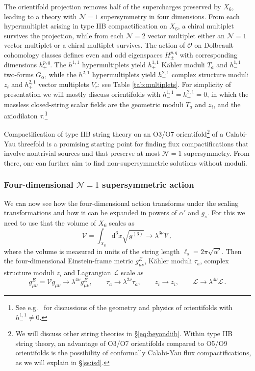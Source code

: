 \documentclass[12pt,a4wide]{article}
\def\d{\mathrm{d}}
\def\V{\mathcal{V}}
\def\L{\mathcal{L}}
\def\be{\begin{equation}}
\def\ee{\end{equation}}
\begin{document}
The orientifold projection removes half of the supercharges preserved by $X_6$, leading to a theory with $\mathcal{N}=1$ supersymmetry in four dimensions.  
From each hypermultiplet arising in type IIB compactification on $X_6$, a chiral multiplet survives the projection, while from each $\mathcal{N}=2$ vector multiplet either an $\mathcal{N}=1$ vector multiplet or a chiral multiplet survives.  
The action of $\mathcal{O}$ on Dolbeault cohomology classes defines even and odd eigenspaces $H^{p,q}_{\pm}$ with corresponding dimensions $h^{p,q}_{\pm}$.  
The $h^{1,1}$ hypermultiplets yield $h^{1,1}_+$ K\"ahler moduli $T_a$ and $h^{1,1}_-$ two-forms $G_\alpha$, while the  
$h^{2,1}$ hypermultiplets yield $h^{2,1}_-$ complex structure moduli $z_i$ and $h^{2,1}_+$ vector multiplets $V_r$: see Table \ref{tab:multiplets}. 
For simplicity of presentation we will mostly discuss orientifolds with $h^{1,1}_-=h^{2,1}_+=0$,
in which
the massless closed-string scalar fields 
are the geometric moduli $T_a$ and $z_i$, and the axiodilaton $\tau$.\footnote{See e.g.~\cite{Grimm:2004uq,Grimm:2007xm,McAllister:2008hb,Gao:2013pra,Hebecker:2018yxs,Carta:2020ohw,Moritz:2023jdb}
for discussions of the geometry and physics of orientifolds with $h^{1,1}_- \neq 0$.}
 
Compactification of type IIB string theory on an O3/O7 orientifold\footnote{We will discuss other string theories in \S\ref{eq:beyondiib}.  Within type IIB string theory, an advantage of O3/O7 orientifolds compared to O5/O9 orientifolds is the possibility of conformally Calabi-Yau flux compactifications, as we will explain in \S\ref{ss:isd}.} of a Calabi-Yau threefold is a promising starting point for finding flux compactifications that involve nontrivial sources and that preserve at most $\mathcal{N}=1$ supersymmetry. From there, one can further aim to find non-supersymmetric solutions without moduli.





\subsubsection*{Four-dimensional $\mathcal{N}=1$ supersymmetric action}
We can now see how the four-dimensional action transforms under the scaling transformations and how it can be expanded in powers of $\alpha'$ and $g_s$. 
For this we need to use that the volume of $X_6$
scales as
\be \label{eq:vscales}
\V=\int_{X_6}\d^6x \sqrt{g^{(6)}}\rightarrow \lambda^{3\nu}\V\,,
\ee
where the volume is measured in units of the string length $\ell_s=2\pi\sqrt{\alpha'}$. Then the four-dimensional Einstein-frame metric $g^E_{\mu\nu}$, K\"ahler moduli $\tau_a$, complex structure  moduli $z_i$ and Lagrangian $\L$ scale as
\begin{equation} \label{eq:gscales}
g^E_{\mu\nu}=\V  g_{\mu\nu}\rightarrow \lambda^{4\nu}g^E_{\mu\nu}, \qquad \tau_a\rightarrow \lambda^{2\nu}\tau_a, \qquad z_i\rightarrow z_i, \qquad  \L\rightarrow \lambda^{4\nu} \L\,.
\end{equation}
\end{document}
